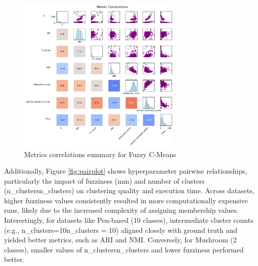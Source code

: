 \begin{figure}[h]
\centering
\includegraphics[width=0.7\textwidth]{figures/metrics_correlations_matrix.png}
\caption{Metrics correlations summary for Fuzzy C-Means}
\label{fig:metrics_corr}
\end{figure}


Additionally, Figure \ref{fig:pairplot} shows hyperparameter pairwise relationships, particularly the impact of fuzziness (mm) and number of clusters (n_clustersn\_clusters) on clustering quality and execution time. Across datasets, higher fuzziness values consistently resulted in more computationally expensive runs, likely due to the increased complexity of assigning membership values. Interestingly, for datasets like Pen-based (10 classes), intermediate cluster counts (e.g., n_clusters=10n\_clusters = 10) aligned closely with ground truth and yielded better metrics, such as ARI and NMI. Conversely, for Mushroom (2 classes), smaller values of n_clustersn\_clusters and lower fuzziness performed better.


